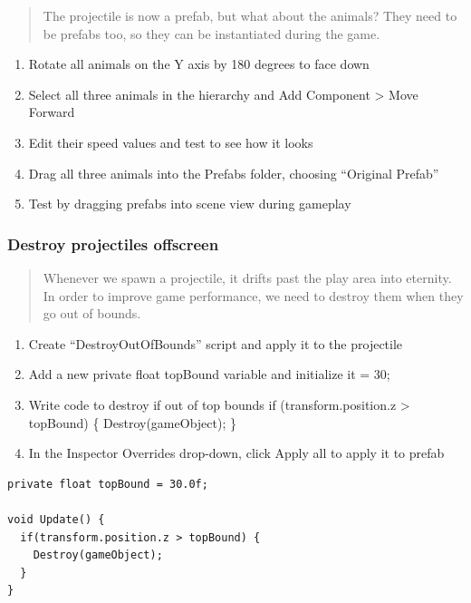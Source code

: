 \documentclass[
]{book}
\providecommand{\tightlist}{%
  \setlength{\itemsep}{0pt}\setlength{\parskip}{0pt}}
\begin{document}
\begin{quote}
The projectile is now a prefab, but what about the animals? They need to be prefabs too, so they can be instantiated during the game.
\end{quote}

\begin{enumerate}
\def\labelenumi{\arabic{enumi}.}
\tightlist
\item
  Rotate all animals on the Y axis by 180 degrees to face down
\item
  Select all three animals in the hierarchy and Add Component \textgreater{} Move Forward
\item
  Edit their speed values and test to see how it looks
\item
  Drag all three animals into the Prefabs folder, choosing ``Original Prefab''
\item
  Test by dragging prefabs into scene view during gameplay
\end{enumerate}

\hypertarget{destroy-projectiles-offscreen}{%
\subsubsection{Destroy projectiles offscreen}\label{destroy-projectiles-offscreen}}

\begin{quote}
Whenever we spawn a projectile, it drifts past the play area into eternity. In order to improve game performance, we need to destroy them when they go out of bounds.
\end{quote}

\begin{enumerate}
\def\labelenumi{\arabic{enumi}.}
\tightlist
\item
  Create ``DestroyOutOfBounds'' script and apply it to the projectile
\item
  Add a new private float topBound variable and initialize it = 30;
\item
  Write code to destroy if out of top bounds if (transform.position.z \textgreater{} topBound) \{
  Destroy(gameObject); \}
\item
  In the Inspector Overrides drop-down, click Apply all to apply it to prefab
\end{enumerate}

\begin{verbatim}
private float topBound = 30.0f;

void Update() {
  if(transform.position.z > topBound) {
    Destroy(gameObject);
  }
}
\end{verbatim}
\end{document}
